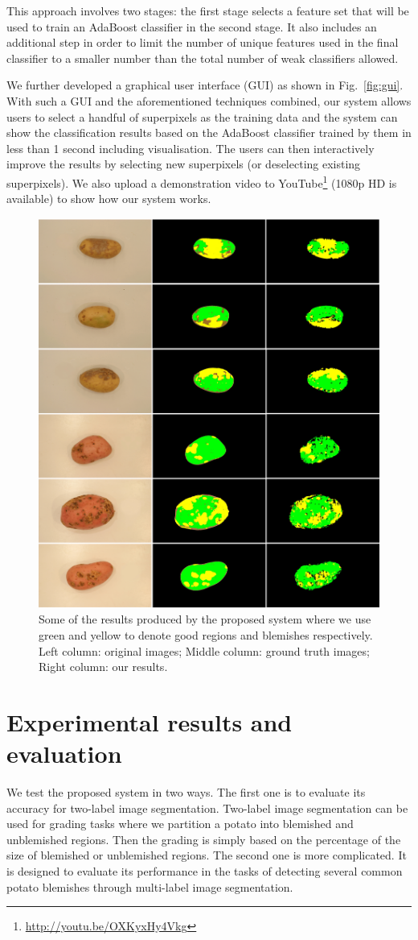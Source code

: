 \documentclass[twocolumn]{svjour3}          %
\begin{document}
This approach involves two stages: the first stage selects a feature set that will be used to train an AdaBoost classifier in the second stage. It also includes an additional step in order to limit the number of unique features used in the final classifier to a smaller number than the total number of weak classifiers allowed. 

We further developed a graphical user interface (GUI) as shown in Fig.~\ref{fig:gui}.  With such a GUI and the aforementioned techniques combined, our system allows users to select a handful of superpixels as the training data and the system can show the classification results based on the AdaBoost classifier trained by them in less than 1 second including visualisation. The users can then interactively improve the results by selecting new superpixels (or deselecting existing superpixels). We also upload a demonstration video to YouTube\footnote{\url{http://youtu.be/OXKyxHy4Vkg}} (1080p HD is available) to show how our system works.
\begin{figure} [t]
\centering
\includegraphics[width=0.8\linewidth]{potatoes.jpg}
\caption{Some of the results produced by the proposed system where we use green and yellow to denote good regions and blemishes respectively. Left column: original images; Middle column: ground truth images; Right column: our results.}
\label{fig:pa}
\end{figure}

\section{Experimental results and evaluation}
We test the proposed system in two ways. The first one is to evaluate its accuracy for two-label image segmentation. Two-label image segmentation can be used for grading tasks where we partition a potato into blemished and unblemished regions. Then the grading is simply based on the percentage of the size of blemished or unblemished regions. The second one is more complicated. It is designed to evaluate its performance in the tasks of detecting several common potato blemishes through multi-label image segmentation.  
\end{document}
